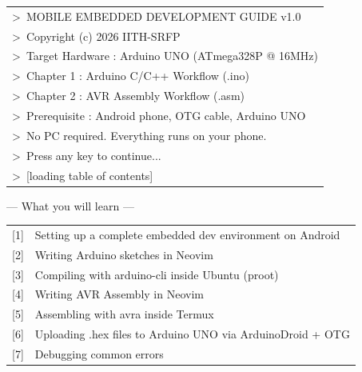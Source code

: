 \documentclass[12pt,a4paper,openany]{report}
\begin{document}
\pagecolor{TermBg}

\vspace*{3cm}
\begin{center}
\begin{tcolorbox}[
  enhanced, arc=0pt, boxrule=0.8pt,
  colback=TermBg, colframe=TermGreenDim,
  width=13cm, halign=center
]
\color{TermGreen}\ttfamily\small
\begin{tabular}{@{}l@{}}
\textgreater\ MOBILE EMBEDDED DEVELOPMENT GUIDE v1.0 \\[4pt]
\textgreater\ Copyright (c) 2026 IITH-SRFP \\[4pt]
\textgreater\ Target Hardware : Arduino UNO (ATmega328P @ 16MHz) \\[4pt]
\textgreater\ Chapter 1       : Arduino C/C++ Workflow (.ino) \\
\textgreater\ Chapter 2       : AVR Assembly Workflow (.asm) \\[4pt]
\textgreater\ Prerequisite    : Android phone, OTG cable, Arduino UNO \\[4pt]
\color{TermAmber}
\textgreater\ No PC required. Everything runs on your phone. \\[4pt]
\color{TermGray}
\textgreater\ Press any key to continue... \\
\textgreater\ [loading table of contents] \\
\end{tabular}
\end{tcolorbox}
\end{center}

\vspace{1cm}
\begin{center}
{\color{TermGray}\ttfamily\small --- What you will learn ---}\\[12pt]
\begin{tabular}{@{}ll@{}}
{\color{TermGreen}\ttfamily\small [1]} & {\color{TermWhite}\ttfamily\small Setting up a complete embedded dev environment on Android} \\[4pt]
{\color{TermGreen}\ttfamily\small [2]} & {\color{TermWhite}\ttfamily\small Writing Arduino sketches in Neovim} \\[4pt]
{\color{TermGreen}\ttfamily\small [3]} & {\color{TermWhite}\ttfamily\small Compiling with arduino-cli inside Ubuntu (proot)} \\[4pt]
{\color{TermGreen}\ttfamily\small [4]} & {\color{TermWhite}\ttfamily\small Writing AVR Assembly in Neovim} \\[4pt]
{\color{TermGreen}\ttfamily\small [5]} & {\color{TermWhite}\ttfamily\small Assembling with avra inside Termux} \\[4pt]
{\color{TermGreen}\ttfamily\small [6]} & {\color{TermWhite}\ttfamily\small Uploading .hex files to Arduino UNO via ArduinoDroid + OTG} \\[4pt]
{\color{TermGreen}\ttfamily\small [7]} & {\color{TermWhite}\ttfamily\small Debugging common errors} \\
\end{tabular}
\end{center}
\end{document}
